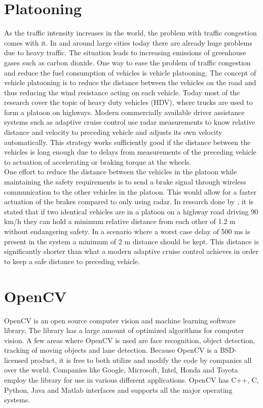 \section{Platooning}
As the traffic intensity increases in the world, the problem with traffic congestion comes with it. In and around large cities today there are already huge problems due to heavy traffic. The situation leads to increasing emissions of greenhouse gases such as carbon dioxide. One way to ease the problem of traffic congestion and reduce the fuel consumption of vehicles is vehicle platooning. The concept of vehicle platooning is to reduce the distance between the vehicles on the road and thus reducing the wind resistance acting on each vehicle. Today most of the research cover the topic of heavy duty vehicles (HDV), where trucks are used to form a platoon on highways. Modern commercially available driver assistance systems such as adaptive cruise control use radar measurements to know relative distance and velocity to preceding vehicle and adjusts its own velocity automatically. This strategy works sufficiently good if the distance between the vehicles is long enough due to delays from measurements of the preceding vehicle to actuation of accelerating or braking torque at the wheels.\\

One effort to reduce the distance between the vehicles in the platoon while maintaining the safety requirements is to send a brake signal through wireless communication to the other vehicles in the platoon. This would allow for a faster actuation of the brakes compared to only using radar. In research done by \cite{alam2014guaranteeing}, it is stated that if two identical vehicles are in a platoon on a highway road driving 90 km/h they can hold a minimum relative distance from each other of 1.2 m without endangering safety. In a scenario where a worst case delay of 500 ms is present in the system a minimum of 2 m distance should be kept. This distance is significantly shorter than what a modern adaptive cruise control achieves in order to keep a safe distance to preceding vehicle.\\




\section{OpenCV}
OpenCV is an open source computer vision and machine learning software library. The library has a large amount of optimized algorithms for computer vision. A few areas where OpenCV is used are face recognition, object detection, tracking of moving objects and lane detection. Because OpenCV is a BSD-licensed product, it is free to both utilize and modify the code by companies all over the world. Companies like Google, Microsoft, Intel, Honda and Toyota employ the library for use in various different applications. OpenCV has C++, C, Python, Java and Matlab interfaces and supports all the major operating systems.\\

